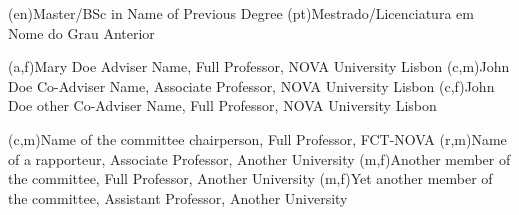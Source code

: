 \ntauthordegree(en){Master/BSc in Name of Previous Degree}
\ntauthordegree(pt){Mestrado/Licenciatura em Nome do Grau Anterior}


(a,f){Mary Doe Adviser Name, Full Professor, NOVA University Lisbon}
(c,m){John Doe Co-Adviser Name, Associate Professor, NOVA University Lisbon}
(c,f){John Doe other Co-Adviser Name, Full Professor, NOVA University Lisbon}

(c,m){Name of the committee chairperson, Full Professor, FCT-NOVA}
(r,m){Name of a rapporteur, Associate Professor, Another University}
(m,f){Another member of the committee, Full Professor, Another University}
(m,f){Yet another member of the committee, Assistant Professor, Another University}
